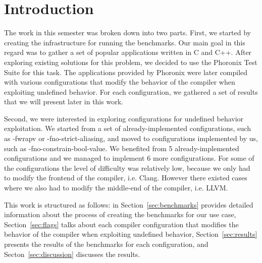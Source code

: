 \section{Introduction}

The work in this semester was broken down into two parts. First, we started by
creating the infrastructure for running the benchmarks. Our main goal in this
regard was to gather a set of popular applications written in C and C++. After
exploring existing solutions for this problem, we decided to use the Phoronix
Test Suite for this task. The applications provided by Phoronix were later
compiled with various configurations that modify the behavior of the compiler
when exploiting undefined behavior. For each configuration, we gathered a set of
results that we will present later in this work.

Second, we were interested in exploring configurations for undefined behavior
exploitation. We started from a set of already-implemented configurations, such
as -fwrapv or -fno-strict-aliasing, and moved to configurations implemented by
us, such as -fno-constrain-bool-value. We benefited from 5 already-implemented
configurations and we managed to implement 6 more configurations. For some of
the configurations the level of difficulty was relatively low, because we only
had to modify the frontend of the compiler, i.e. Clang. However there existed
cases where we also had to modify the middle-end of the compiler, i.e. LLVM.

This work is structured as follows: in Section~\ref{sec:benchmarks} provides
detailed information about the process of creating the benchmarks for our use
case, Section~\ref{sec:flags} talks about each compiler configuration that
modifies the behavior of the compiler when exploiting undefined behavior,
Section~\ref{sec:results} presents the results of the benchmarks for each
configuration, and Secton~\ref{sec:discussion} discusses the results.
